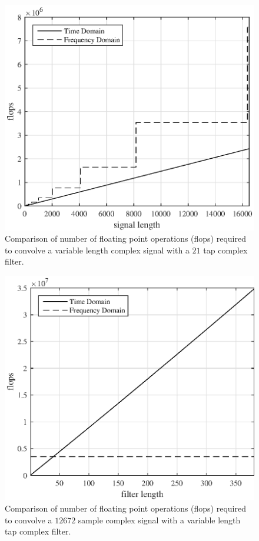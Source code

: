 \begin{figure}
	\centering\includegraphics[width=5in]{figures/gpu_intro/Theory21Tap_flops.eps}
	\caption{Comparison of number of floating point operations (flops) required to convolve a variable length complex signal with a $21$ tap complex filter.}
	\label{fig:Theory21Tap_flops}
\end{figure}
\begin{figure} 
	\centering\includegraphics[width=5in]{figures/gpu_intro/Theory12672signal_flops.eps}
	\caption{Comparison of number of floating point operations (flops) required to convolve a $12672$ sample complex signal with a variable length tap complex filter.}
	\label{fig:Theory12672signal_flops}
\end{figure}

